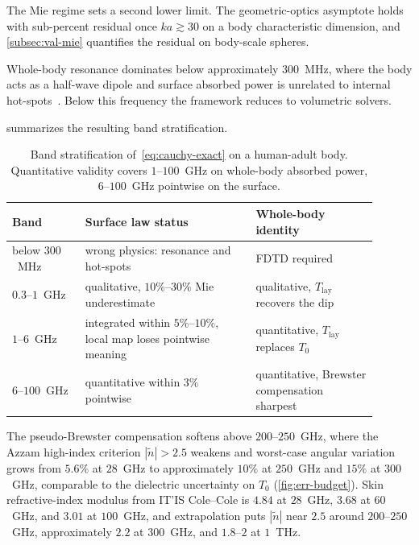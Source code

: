 \documentclass[journal,twocolumn,10pt]{IEEEtran}
\theoremstyle{plain}
\theoremstyle{remark}
\newcommand{\Tlay}{T_{\mathrm{lay}}}
\newcommand{\ntilde}{\tilde{n}}
\begin{document}
The Mie regime sets a second lower limit. The geometric-optics
asymptote holds with sub-percent residual once $ka \gtrsim 30$ on a
body characteristic dimension, and \cref{subsec:val-mie} quantifies
the residual on body-scale spheres.

Whole-body resonance dominates below approximately $300$~MHz, where
the body acts as a half-wave dipole and surface absorbed power is
unrelated to internal hot-spots~\cite{Durney1986}. Below this
frequency the framework reduces to volumetric solvers.

 summarizes the resulting band stratification.

\begin{table}[!t]
\centering
\caption{Band stratification of~\eqref{eq:cauchy-exact} on a
human-adult body. Quantitative validity covers $1$--$100$~GHz on
whole-body absorbed power, $6$--$100$~GHz pointwise on the
surface.}
\label{tab:bands}
\small
\setlength{\tabcolsep}{4pt}
\begin{tabular}{@{}>{\raggedright\arraybackslash}p{0.18\linewidth}
                  >{\raggedright\arraybackslash}p{0.42\linewidth}
                  >{\raggedright\arraybackslash}p{0.30\linewidth}@{}}
\toprule
Band & Surface law status & Whole-body identity \\
\midrule
below $300$~MHz
  & wrong physics: resonance and hot-spots
  & FDTD required \\
$0.3$--$1$~GHz
  & qualitative, $10\%$--$30\%$ Mie underestimate
  & qualitative, $\Tlay$ recovers the dip \\
$1$--$6$~GHz
  & integrated within $5\%$--$10\%$, local map loses pointwise meaning
  & quantitative, $\Tlay$ replaces $T_0$ \\
$6$--$100$~GHz
  & quantitative within $3\%$ pointwise
  & quantitative, Brewster compensation sharpest \\
\bottomrule
\end{tabular}
\end{table}

The pseudo-Brewster compensation softens above $200$--$250$~GHz,
where the Azzam high-index criterion $|\ntilde| > 2.5$ weakens and
worst-case angular variation grows from $5.6\%$ at $28$~GHz to
approximately $10\%$ at $250$~GHz and $15\%$ at $300$~GHz, comparable
to the dielectric uncertainty on $T_0$ (\cref{fig:err-budget}). Skin
refractive-index modulus from IT'IS Cole--Cole is $4.84$ at $28$~GHz,
$3.68$ at $60$~GHz, and $3.01$ at $100$~GHz, and extrapolation puts
$|\ntilde|$ near $2.5$ around $200$--$250$~GHz, approximately $2.2$
at $300$~GHz, and $1.8$--$2$ at $1$~THz.
\end{document}
